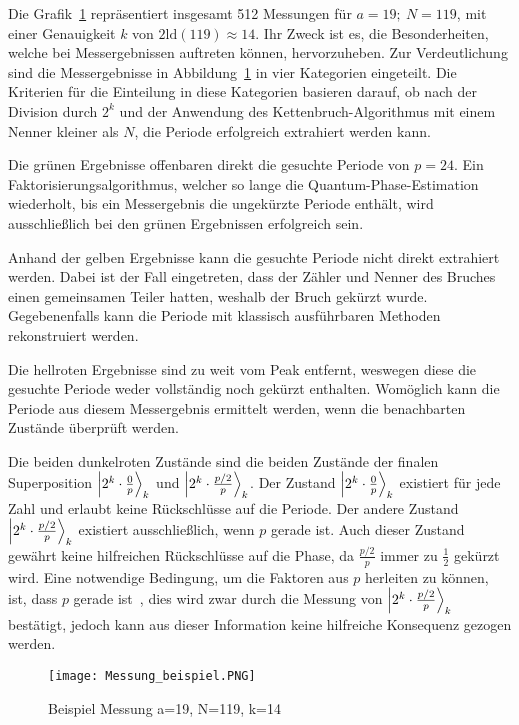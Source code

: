 \bigskip

Die Grafik~\ref{fig:shor_measure} repräsentiert insgesamt 512 Messungen für \(a=19;~N=119\), 
mit einer Genauigkeit \(k\) von \(2\text{ld}(119) \approx 14 \). 
Ihr Zweck ist es, die Besonderheiten, 
welche bei Messergebnissen auftreten können, hervorzuheben.
Zur Verdeutlichung sind die Messergebnisse in Abbildung~\ref{fig:shor_measure} in vier Kategorien eingeteilt.
Die Kriterien für die Einteilung in diese Kategorien basieren darauf, 
ob nach der Division durch \(2^k\) und 
der Anwendung des Kettenbruch-Algorithmus mit einem Nenner kleiner als \(N\), 
die Periode erfolgreich extrahiert werden kann.

Die grünen Ergebnisse offenbaren direkt die gesuchte Periode von \(p = 24\).
Ein Faktorisierungsalgorithmus, welcher so lange die Quantum-Phase-Estimation wiederholt, 
bis ein Messergebnis die ungekürzte Periode enthält, 
wird ausschließlich bei den grünen Ergebnissen erfolgreich sein.

Anhand der gelben Ergebnisse kann die gesuchte Periode nicht direkt extrahiert werden.
Dabei ist der Fall eingetreten, dass der Zähler und Nenner des Bruches einen gemeinsamen Teiler hatten, 
weshalb der Bruch gekürzt wurde.
Gegebenenfalls kann die Periode mit klassisch ausführbaren Methoden rekonstruiert werden.

Die hellroten Ergebnisse sind zu weit vom Peak entfernt,
weswegen diese die gesuchte Periode weder vollständig noch gekürzt enthalten.
Womöglich kann die Periode aus diesem Messergebnis ermittelt werden, 
wenn die benachbarten Zustände überprüft werden.

Die beiden dunkelroten Zustände sind die beiden Zustände der finalen Superposition
\(\ket{2^k \cdot \frac{0}{p}}_k\) und \(\ket{2^k \cdot \frac{p/2}{p}}_k\).
Der Zustand \(\ket{2^k \cdot \frac{0}{p}}_k\) existiert für jede Zahl und erlaubt keine 
Rückschlüsse auf die Periode.
Der andere Zustand \(\ket{2^k \cdot \frac{p/2}{p}}_k\) existiert ausschließlich, wenn \(p\) gerade ist.
Auch dieser Zustand gewährt keine hilfreichen Rückschlüsse auf die Phase, 
da \(\frac{p/2}{p}\) immer zu \(\frac{1}{2}\) gekürzt wird.
Eine notwendige Bedingung, um die Faktoren aus \(p\) herleiten zu können, 
ist, dass \(p\) gerade ist~\cite*{Shor_1997}, 
dies wird zwar durch die Messung von \(\ket{2^k \cdot \frac{p/2}{p}}_k\) bestätigt, 
jedoch kann aus dieser Information keine hilfreiche Konsequenz gezogen werden.

\begin{figure}[H]
  \centering
  \texttt{[image: Messung\_beispiel.PNG]}
  \caption{Beispiel Messung a=19, N=119, k=14}
  \label{fig:shor_measure}
\end{figure}


